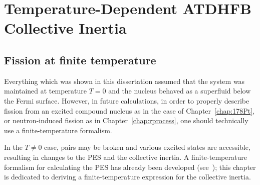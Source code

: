 \chapter{Temperature-Dependent ATDHFB Collective Inertia}\label{append:TD-ATDHFB}




\section{Fission at finite temperature}

Everything which was shown in this dissertation assumed that the system was maintained at temperature $T=0$ and the nucleus behaved as a superfluid below the Fermi surface. However, in future calculations, in order to properly describe fission from an excited compound nucleus as in the case of Chapter~\ref{chap:178Pt}, or neutron-induced fission as in Chapter~\ref{chap:rprocess}, one should technically use a finite-temperature formalism.

In the $T\neq0$ case, pairs may be broken and various excited states are accessible, resulting in changes to the PES and the collective inertia. A finite-temperature formalism for calculating the PES has already been developed (see~\cite{Schunck2015b, Mcdonnell2014}); this chapter is dedicated to deriving a finite-temperature expression for the collective inertia.


